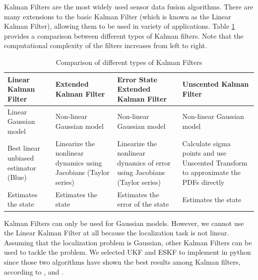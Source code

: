 Kalman Filters are the most widely used sensor data fusion algorithms. There 
are many extensions to the basic Kalman Filter (which is known as the Linear Kalman Filter), allowing them to be used in variety of applications. Table \ref{table:ch:KalmanFilterComparison} provides a 
comparison between different types of Kalman filters. Note that the computational complexity of the filters increases from left to right.
\begin{table}[htp]
	\centering
	\begin{tabular}{|p{3.4cm}|p{3.4cm}|p{3.4cm}|p{3.4cm}|} 
		\hline
		\textbf{Linear Kalman Filter} & \textbf{Extended Kalman Filter} & \textbf{Error State Extended Kalman Filter} & \textbf{Unscented Kalman Filter} \\
		\hline
		Linear Gaussian model&Non-linear Gaussian model&Non-linear  Gaussian model&Non-linear Gaussian model\\
		\hline
		Best linear unbiased estimator (Blue)&Linearize the nonlinear dynamics using Jacobians (Taylor series)&Linearize the nonlinear 
		dynamics of error using Jacobians (Taylor series)&Calculate sigma points and use Unscented Transform to approximate the PDFs directly\\
		\hline
		Estimates the state & Estimates the state& Estimates the error of the state & Estimates the state\\
		\hline
	\end{tabular}
	\caption{Comparison of different types of Kalman Filters}
	\label{table:ch:KalmanFilterComparison}
	\vspace{0.5cm}
\end{table}

Kalman Filters can only be used for Gaussian models. However, we cannot use the Linear Kalman Filter at all because the localization task is not linear. Assuming that the localization problem is Gaussian, other Kalman Filters can be used to tackle the problem. We selected  \gls{UKF} and \gls{ESKF} to implement in python since those two algorithms have shown the best results among Kalman filters, according to \cite{ch24:st2004comparison},\cite{ch25:madyastha2011extended} and \cite{ch26:wan2000unscented}.

